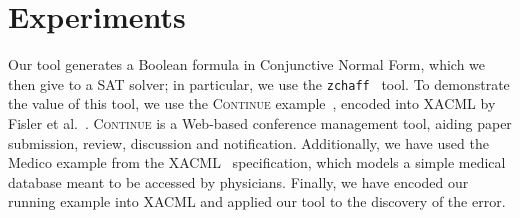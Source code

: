 \section{Experiments}
\label{sec:experiments}

Our tool generates a Boolean formula in Conjunctive Normal Form, which
we then give to a SAT solver; in particular, we use the
\texttt{zchaff}~\cite{moskewicz01chaff} tool.  To demonstrate the
value of this tool, we use the \textsc{Continue}
example~\cite{krishnamurthi03continue}, encoded into XACML by Fisler
et al.~\cite{fisler05}.  \textsc{Continue} is a Web-based conference
management tool, aiding paper submission, review, discussion and
notification.  Additionally, we have used the Medico example from the
XACML~\cite{xacml} specification, which models a simple medical
database meant to be accessed by physicians.  Finally, we have encoded
our running example into XACML and applied our tool to the discovery
of the error.

